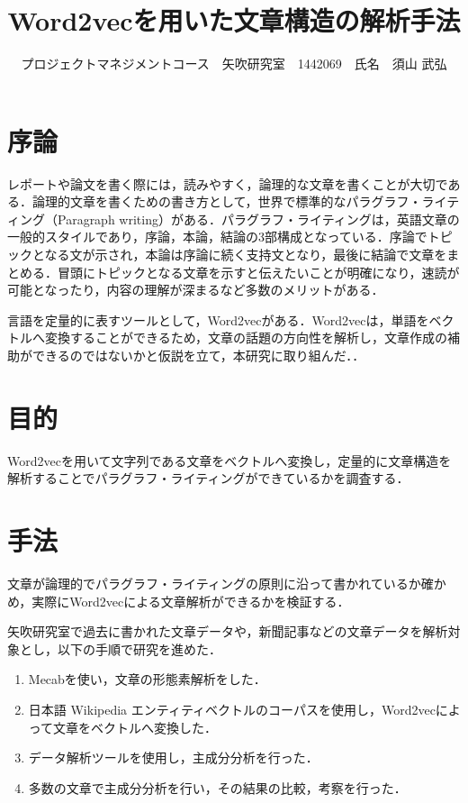 \documentclass[uplatex,twocolumn,dvipdfmx]{jsarticle}
\title{\vspace{-5mm}\fontsize{14pt}{0pt}\selectfont Word2vecを用いた文章構造の解析手法}
\author{\normalsize プロジェクトマネジメントコース　矢吹研究室　1442069　氏名　須山 武弘}
\date{}
\begin{document}
\fontsize{10.5pt}{\baselineskip}\selectfont
\maketitle





\section{序論}\label{序論}
レポートや論文を書く際には，読みやすく，論理的な文章を書くことが大切である．論理的文章を書くための書き方として，世界で標準的なパラグラフ・ライティング（Paragraph writing）がある\cite{02}．パラグラフ・ライティングは，英語文章の一般的スタイルであり，序論，本論，結論の3部構成となっている．序論でトピックとなる文が示され，本論は序論に続く支持文となり，最後に結論で文章をまとめる．冒頭にトピックとなる文章を示すと伝えたいことが明確になり，速読が可能となったり，内容の理解が深まるなど多数のメリットがある．

言語を定量的に表すツールとして，Word2vecがある．Word2vecは，単語をベクトルへ変換することができるため，文章の話題の方向性を解析し，文章作成の補助ができるのではないかと仮説を立て，本研究に取り組んだ．\cite{01}．

\section{目的}
Word2vecを用いて文字列である文章をベクトルへ変換し，定量的に文章構造を解析することでパラグラフ・ライティングができているかを調査する．

\section{手法}

文章が論理的でパラグラフ・ライティングの原則に沿って書かれているか確かめ，実際にWord2vecによる文章解析ができるかを検証する．

矢吹研究室で過去に書かれた文章データや，新聞記事などの文章データを解析対象とし，以下の手順で研究を進めた．
\begin{enumerate}
 \item Mecabを使い，文章の形態素解析をした．
 \item 日本語 Wikipedia エンティティベクトルのコーパスを使用し，Word2vecによって文章をベクトルへ変換した．
 \item データ解析ツールを使用し，主成分分析を行った．
 \item 多数の文章で主成分分析を行い，その結果の比較，考察を行った．
\end{enumerate}
\end{document}
